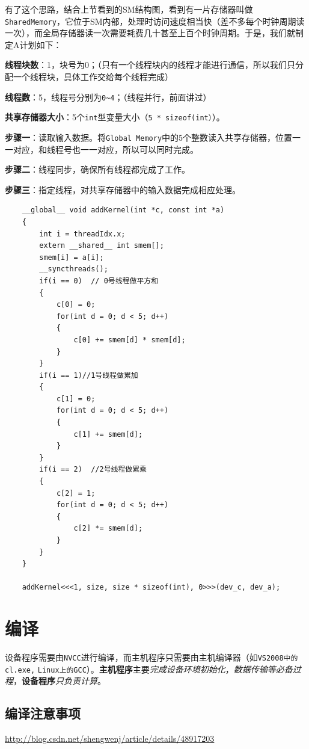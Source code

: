 \documentclass[UTF8,a4paper,12pt]{ctexbook}
\begin{document}
			有了这个思路，结合上节看到的SM结构图，看到有一片存储器叫做\verb|SharedMemory|，它位于SM内部，处理时访问速度相当快（差不多每个时钟周期读一次），而全局存储器读一次需要耗费几十甚至上百个时钟周期。于是，我们就制定A计划如下：
 
			\textbf{线程块数}：1，块号为0；（只有一个线程块内的线程才能进行通信，所以我们只分配一个线程块，具体工作交给每个线程完成）
			 
			\textbf{线程数}：5，线程号分别为\verb|0~4|；（线程并行，前面讲过）
			 
			\textbf{共享存储器大小}：5个\verb|int|型变量大小（\verb|5 * sizeof(int）|）。 
			
			\textbf{步骤一}：读取输入数据。将\verb|Global Memory|中的5个整数读入共享存储器，位置一一对应，和线程号也一一对应，所以可以同时完成。
			 
			\textbf{步骤二}：线程同步，确保所有线程都完成了工作。 
			
			\textbf{步骤三}：指定线程，对共享存储器中的输入数据完成相应处理。
			
			\begin{lstlisting}
	__global__ void addKernel(int *c, const int *a)   
	{   
		int i = threadIdx.x;   
		extern __shared__ int smem[];   
		smem[i] = a[i];   
		__syncthreads();   
		if(i == 0)  // 0号线程做平方和   
		{   
			c[0] = 0;   
			for(int d = 0; d < 5; d++)   
			{   
				c[0] += smem[d] * smem[d];   
			}   
		}   
		if(i == 1)//1号线程做累加   
		{   
			c[1] = 0;   
			for(int d = 0; d < 5; d++)   
			{   
				c[1] += smem[d];   
			}   
		}   
		if(i == 2)  //2号线程做累乘   
		{   
			c[2] = 1;   
			for(int d = 0; d < 5; d++)   
			{   
				c[2] *= smem[d];   
			}   
		}   
	}   
	
	addKernel<<<1, size, size * sizeof(int), 0>>>(dev_c, dev_a);
			\end{lstlisting}
	\section{编译}
		设备程序需要由\verb|NVCC|进行编译，而主机程序只需要由主机编译器（如\verb|VS2008中的cl.exe,| \verb|Linux上的GCC|）。\textbf{主机程序}主要\textit{完成设备环境初始化}，\textit{数据传输等必备过程}，\textbf{设备程序}\textit{只负责计算}。 
		
		\subsection{编译注意事项}
			\url{http://blog.csdn.net/shengwenj/article/details/48917203}		
\end{document}
